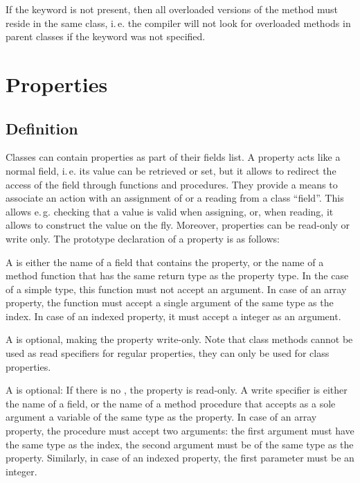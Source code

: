 If the  keyword is not present, then all overloaded versions
of the method must reside in the same class, i.\,e. the compiler will not 
look for overloaded methods in parent classes if the  keyword 
was not specified.

\section{Properties}
\subsection{Definition}
Classes can contain properties as part of their fields list. A property
acts like a normal field, i.\,e. its value can be retrieved or set, but it
allows to redirect the access of the field through functions and
procedures. They provide a means to associate an action with an assignment
of or a reading from a class ``field''. This allows e.\,g. checking that a
value is valid when assigning, or, when reading, it allows to construct the
value on the fly. Moreover, properties can be read-only or write only.
The prototype declaration of a property is as follows:


A   is either the name of a field that contains the
property, or the name of a method function that has the same return type as
the property type. In the case of a simple type, this
function must not accept an argument. In case of an array property, the
function must accept a single argument of the same type as the index.
In case of an indexed property, it must accept a integer as an argument.

A  is optional, making the property write-only.
Note that class methods cannot be used as read specifiers for regular 
properties, they can only be used for class properties.

A   is optional: If there is no , 
the property is read-only. A write specifier is either the name of a field, or
the name of a method procedure that accepts as a sole argument a variable of
the same type as the property. In case of an array property, the procedure
must accept two arguments: the first argument must have the same type as the
index, the second argument must be of the same type as the property.
Similarly, in case of an indexed property, the first parameter must be an integer.

